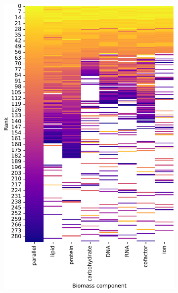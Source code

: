 \begin{figure}[htbp!]
  \centering
  \begin{subfigure}[t]{0.45\textwidth}
  \centering
    \includegraphics[width=\linewidth]{CompareEnzUse_glc00p00_pyr08p89_ammUnres_1.pdf}
    \caption{
    }
    \label{fig:model-rank-pyr-lowratio-rank}
  \end{subfigure}%
  \begin{subfigure}[t]{0.45\textwidth}
  \centering

\end{subfigure}
\end{figure}
